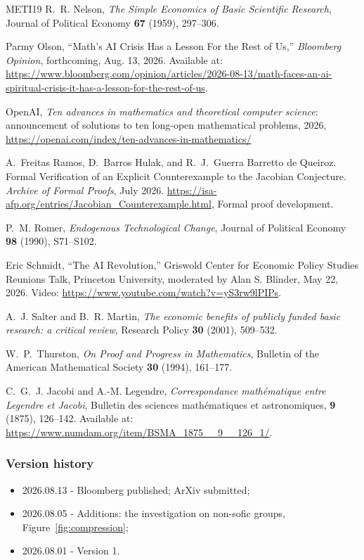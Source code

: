 \documentclass[11pt, a4paper,twosided]{amsart}
\begin{document}
\begin{thebibliography}{METI19}
  R.~R. Nelson, \emph{The Simple Economics of Basic Scientific Research}, Journal of Political Economy \textbf{67} (1959), 297--306.

  Parmy Olson,
  ``Math’s AI Crisis Has a Lesson For the Rest of Us,''
    \textit{Bloomberg Opinion}, forthcoming, Aug. 13, 2026.
    Available at: \url{https://www.bloomberg.com/opinion/articles/2026-08-13/math-faces-an-ai-spiritual-crisis-it-has-a-lesson-for-the-rest-of-us}.

  OpenAI, \emph{Ten advances in mathematics and theoretical computer science}: announcement of solutions to ten long-open mathematical problems, 2026, \url{https://openai.com/index/ten-advances-in-mathematics/} 

  
  A.~Freitas Ramos, D.~Barros Hulak, and
  R.~J.~Guerra Barretto de Queiroz.
  \newblock Formal Verification of an Explicit Counterexample to the Jacobian Conjecture.
  \newblock \emph{Archive of Formal Proofs}, July 2026.
  \newblock \url{https://isa-afp.org/entries/Jacobian_Counterexample.html},
  Formal proof development.

  
  P.~M. Romer, \emph{Endogenous Technological Change}, Journal of Political Economy \textbf{98} (1990), S71--S102.

  Eric Schmidt, ``The AI Revolution,'' Griswold Center for Economic Policy Studies
  Reunions Talk, Princeton University, moderated by Alan S. Blinder,
  May 22, 2026. Video: \url{https://www.youtube.com/watch?v=yS3rw9lPIPs}.

  A.~J. Salter and B.~R. Martin, \emph{The economic benefits of publicly funded basic research: a critical review}, Research Policy \textbf{30} (2001), 509--532.

  W.~P.~Thurston, \emph{On Proof and Progress in Mathematics}, Bulletin of the American Mathematical Society \textbf{30} (1994), 161--177.

  C.~G.~J. Jacobi and A.-M. Legendre,
  \emph{Correspondance mathématique entre Legendre et Jacobi},
  Bulletin des sciences mathématiques et astronomiques,
  \textbf{9} (1875), 126--142.
  Available at: \url{https://www.numdam.org/item/BSMA_1875__9__126_1/}.

\end{thebibliography}


\vfill

\subsubsection*{\sffamily Version history}
\begin{itemize}
  \item 2026.08.13 - Bloomberg published; ArXiv submitted;
  \item 2026.08.05 - Additions: the investigation on non-sofic groups, Figure~\ref{fig:compression};
  \item 2026.08.01 - Version 1.
\end{itemize}
\end{document}

